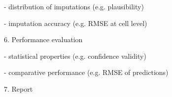 \documentclass[bimj,fleqn]{w-art}
\begin{document}
- distribution of imputations (e.g. plausibility)

- imputation accuracy (e.g. RMSE at cell level)

6. Performance evaluation

- statistical properties (e.g. confidence validity)

- comparative performance (e.g. RMSE of predictions)

7. Report





\end{document}
